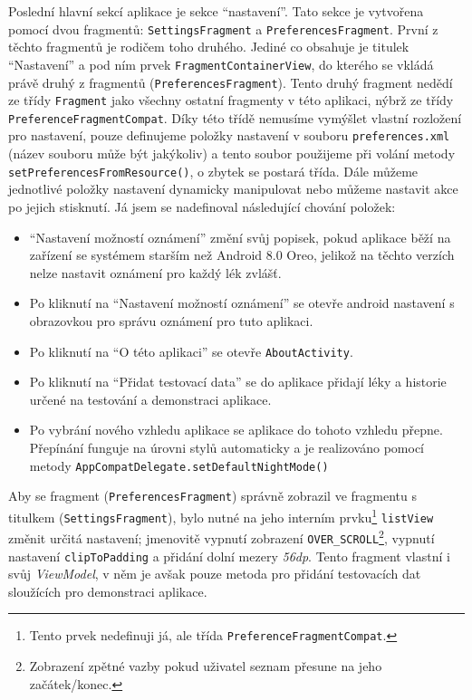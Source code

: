 \documentclass[../TakeYourPill.tex]{subfiles}
\begin{document}
Poslední hlavní sekcí aplikace je sekce \enquote{nastavení}. Tato sekce je vytvořena pomocí dvou fragmentů: \texttt{SettingsFragment} a \texttt{PreferencesFragment}. První z těchto fragmentů je rodičem toho druhého. Jediné co obsahuje je titulek \enquote{Nastavení} a pod ním prvek \texttt{FragmentContainerView}, do kterého se vkládá právě druhý z fragmentů (\texttt{PreferencesFragment}). Tento druhý fragment nedědí ze třídy \texttt{Fragment} jako všechny ostatní fragmenty v této aplikaci, nýbrž ze třídy \texttt{PreferenceFragmentCompat}. Díky této třídě nemusíme vymýšlet vlastní rozložení pro nastavení, pouze definujeme položky nastavení v souboru \texttt{preferences.xml} (název souboru může být jakýkoliv) a tento soubor použijeme při volání metody \texttt{setPreferencesFromResource()}, o zbytek se postará třída. Dále můžeme jednotlivé položky nastavení dynamicky manipulovat nebo můžeme nastavit akce po jejich stisknutí. Já jsem se nadefinoval následující chování položek:
\begin{itemize}
  \item \enquote{Nastavení možností oznámení} změní svůj popisek, pokud aplikace běží na zařízení se systémem starším než Android 8.0 Oreo, jelikož na těchto verzích nelze nastavit oznámení pro každý lék zvlášť.
  \item Po kliknutí na \enquote{Nastavení možností oznámení} se otevře android nastavení s obrazovkou pro správu oznámení pro tuto aplikaci.
  \item Po kliknutí na \enquote{O této aplikaci} se otevře \texttt{AboutActivity}.
  \item Po kliknutí na \enquote{Přidat testovací data} se do aplikace přidají léky a historie určené na testování a demonstraci aplikace.
  \item Po vybrání nového vzhledu aplikace se aplikace do tohoto vzhledu přepne. \label{sec:theme} Přepínání funguje na úrovni stylů automaticky a je realizováno pomocí metody \texttt{AppCompatDelegate.setDefaultNightMode()}
\end{itemize}

Aby se fragment (\texttt{PreferencesFragment}) správně zobrazil ve fragmentu s titulkem (\texttt{SettingsFragment}), bylo nutné na jeho interním prvku\footnote{Tento prvek nedefinuji já, ale třída \texttt{PreferenceFragmentCompat}.} \texttt{listView} změnit určitá nastavení; jmenovitě vypnutí zobrazení \texttt{OVER\_SCROLL}\footnote{Zobrazení zpětné vazby pokud uživatel seznam přesune na jeho začátek/konec.}, vypnutí nastavení \texttt{clipToPadding} a přidání dolní mezery \textit{56dp}.
Tento fragment vlastní i svůj \textit{ViewModel}, v něm je avšak pouze metoda pro přidání testovacích dat sloužících pro demonstraci aplikace.
\end{document}

